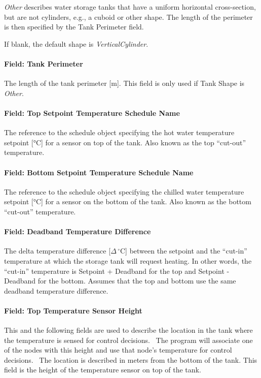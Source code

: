\emph{Other} describes water storage tanks that have a uniform horizontal
cross-section, but are not cylinders, e.g., a cuboid or other shape. The length
of the perimeter is then specified by the Tank Perimeter field.

If blank, the default shape is \emph{VerticalCylinder}.

\paragraph{Field: Tank Perimeter}\label{field-tank-perimeter-thermalstoragehotwaterstratified}

The length of the tank perimeter {[}m{]}. This field is only used if Tank Shape
is \emph{Other}.
\paragraph{Field: Top Setpoint Temperature Schedule Name}
The reference to the schedule object specifying the hot water temperature
setpoint {[}°C{]} for a sensor on top of the tank. Also known as the top
``cut-out'' temperature.
\paragraph{Field: Bottom Setpoint Temperature Schedule Name}
The reference to the schedule object specifying the chilled water temperature
setpoint {[}°C{]} for a sensor on the bottom of the tank. Also known as the
bottom ``cut-out'' temperature.
\paragraph{Field: Deadband Temperature Difference}\label{field-deadband-temperature-difference-thermalstoragehotwaterstratified}
The delta temperature difference {[}\(\Delta\,^{\circ}\mathrm{C}\){]} between the setpoint and the
``cut-in'' temperature at which the storage tank will request heating. In other
words, the ``cut-in'' temperature is Setpoint + Deadband for the top and
Setpoint - Deadband for the bottom. Assumes that the top and bottom use the same
deadband temperature difference.
\paragraph{Field: Top Temperature Sensor Height}\label{field-top-temperature-sensor-height-thermalstoragehotwaterstratified}
This and the following fields are used to describe the location in the tank where the temperature is
sensed for control decisions.~ The program will associate one of the nodes with
this height and use that node's temperature for control decisions.~ The location
is described in meters from the bottom of the tank.
This field is the height of the temperature sensor on top of the tank.
